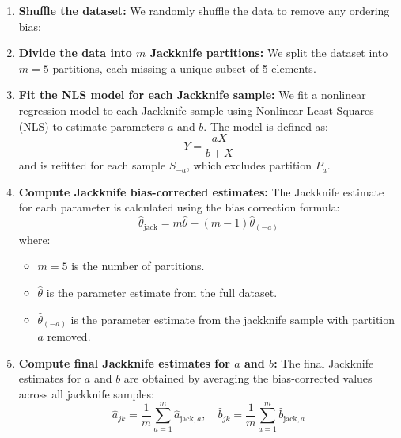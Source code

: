 \documentclass[]{article}
\begin{document}
\begin{enumerate}
	\item \textbf{Shuffle the dataset:} We randomly shuffle the data to remove any ordering bias:

	\item \textbf{Divide the data into $m$ Jackknife partitions:} We split the dataset into $m = 5$ partitions, each missing a unique subset of 5 elements.
	
	\item \textbf{Fit the NLS model for each Jackknife sample:} We fit a nonlinear regression model to each Jackknife sample using Nonlinear Least Squares (NLS) to estimate parameters $a$ and $b$. The model is defined as:
	\begin{equation}
		Y = \frac{aX}{b+X}
	\end{equation}
	and is refitted for each sample $S_{-a}$, which excludes partition $P_a$.
	
	\item \textbf{Compute Jackknife bias-corrected estimates:} The Jackknife estimate for each parameter is calculated using the bias correction formula:
	\begin{equation}
		\hat{\theta}_{\text{jack}} = m \hat{\theta} - (m-1) \hat{\theta}_{(-a)}
	\end{equation}
	where:
	\begin{itemize}
		\item $m = 5$ is the number of partitions.
		\item $\hat{\theta}$ is the parameter estimate from the full dataset.
		\item $\hat{\theta}_{(-a)}$ is the parameter estimate from the jackknife sample with partition $a$ removed.
	\end{itemize}
	
	\item \textbf{Compute final Jackknife estimates for $a$ and $b$:} The final Jackknife estimates for $a$ and $b$ are obtained by averaging the bias-corrected values across all jackknife samples:
	\begin{equation}
		\hat{a}_{jk} = \frac{1}{m} \sum_{a=1}^{m} \hat{a}_{\text{jack}, a}, \quad
		\hat{b}_{jk} = \frac{1}{m} \sum_{a=1}^{m} \hat{b}_{\text{jack}, a}
	\end{equation}
\end{enumerate}
\end{document}
